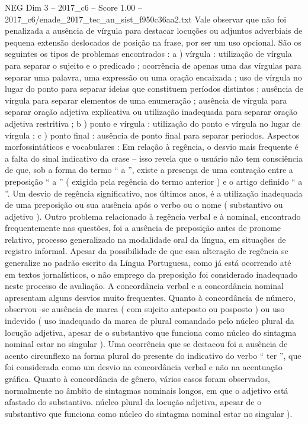 \begin{textsample}{NEG Dim 3 – 2017\_c6 – Score 1.00 – 2017\_c6/enade\_2017\_tec\_an\_sist\_f950c36aa2.txt}
Vale observar que não foi penalizada a ausência de vírgula para destacar locuções ou adjuntos adverbiais de pequena extensão deslocados de posição na frase, por ser um uso opcional.
São os seguintes os tipos de problemas encontrados : a ) vírgula : utilização de vírgula para separar o sujeito e o predicado ; ocorrência de apenas uma das vírgulas para separar uma palavra, uma expressão ou uma oração encaixada ; uso de vírgula no lugar do ponto para separar ideias que constituem períodos distintos ; ausência de vírgula para separar elementos de uma enumeração ; ausência de vírgula para separar oração adjetiva explicativa ou utilização inadequada para separar oração adjetiva restritiva ; b ) ponto e vírgula : utilização do ponto e vírgula no lugar de vírgula ; c ) ponto final : ausência de ponto final para separar períodos.
Aspectos morfossintáticos e vocabulares : Em relação à regência, o desvio mais frequente é a falta do sinal indicativo da crase – isso revela que o usuário não tem consciência de que, sob a forma do termo “ a ”, existe a presença de uma contração entre a preposição “ a ” ( exigida pela regência do termo anterior ) e o artigo definido “ a ”.
Um desvio de regência significativo, nos últimos anos, é a utilização inadequada de uma preposição ou sua ausência após o verbo ou o nome ( substantivo ou adjetivo ).
Outro problema relacionado à regência verbal e à nominal, encontrado frequentemente nas questões, foi a ausência de preposição antes de pronome relativo, processo generalizado na modalidade oral da língua, em situações de registro informal.
Apesar da possibilidade de que essa alteração de regência se generalize no padrão escrito da Língua Portuguesa, como já está ocorrendo até em textos jornalísticos, o não emprego da preposição foi considerado inadequado neste processo de avaliação.
A concordância verbal e a concordância nominal apresentam alguns desvios muito frequentes.
Quanto à concordância de número, observou -se ausência de marca ( com sujeito anteposto ou posposto ) ou uso indevido ( uso inadequado da marca de plural comandado pelo núcleo plural da locução adjetiva, apesar de o substantivo que funciona como núcleo do sintagma nominal estar no singular ).
Uma ocorrência que se destacou foi a ausência de acento circunflexo na forma plural do presente do indicativo do verbo “ ter ”, que foi considerada como um desvio na concordância verbal e não na acentuação gráfica.
Quanto à concordância de gênero, vários casos foram observados, normalmente no âmbito de sintagmas nominais longos, em que o adjetivo está afastado do substantivo. núcleo plural da locução adjetiva, apesar de o substantivo que funciona como núcleo do sintagma nominal estar no singular ).

\end{textsample}

